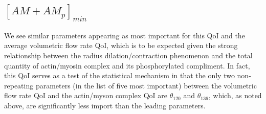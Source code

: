 \subsection{$[AM+AM_p]_{min}$}
We see similar parameters appearing as most important for this QoI and the average volumetric flow rate QoI, which is to be expected given the strong relationship between the radius dilation/contraction phenomenon and the total quantity of actin/myosin complex and its phosphorylated compliment. In fact, this QoI serves as a test of the statistical mechanism in that the only two non-repeating parameters (in the list of five most important) between the volumetric flow rate QoI and the actin/myson complex QoI are $\theta_{120}$ and $\theta_{136}$, which, as noted above, are significantly less import than the leading parameters.
%
%
%
%
%
%
%
